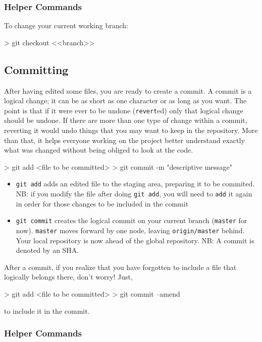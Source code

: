 \documentclass[10pt,letterpaper]{article}
\begin{document}
\subsubsection{Helper Commands}

To change your current working branch:
\begin{code}
> git checkout <<branch>>
\end{code}

\subsection{Committing}
After having edited some files, you are ready to create a commit. A commit is a logical change; it can be as short as one character or as long as you want. The point is that if it were ever to be undone (\texttt{revert}ed) only that logical change should be undone. If there are more than one type of change within a commit, reverting it would undo things that you may want to keep in the repository. More than that, it helps everyone working on the project better understand exactly what was changed without being obliged to look at the code.

\begin{code}
> git add <file to be committed>
> git commit -m "descriptive message"
\end{code}

\begin{itemize}
\item \texttt{git add} adds an edited file to the staging area, preparing it to be commited. NB: if you modify the file after doing \texttt{git add}, you will need to \texttt{add} it again in order for those changes to be included in the commit
\item \texttt{git commit} creates the logical commit on your current branch (\texttt{master} for now). \texttt{master} moves forward by one node, leaving \texttt{origin/master} behind. Your local repository is now ahead of the global repository. NB: A commit is denoted by an SHA.
\end{itemize}

After a commit, if you realize that you have forgotten to include a file that logically belongs there, don't worry! Just,
\begin{code}
> git add <file to be committed>
> git commit --amend
\end{code}
\noindent to include it in the commit.

\subsubsection{Helper Commands}
\end{document}
